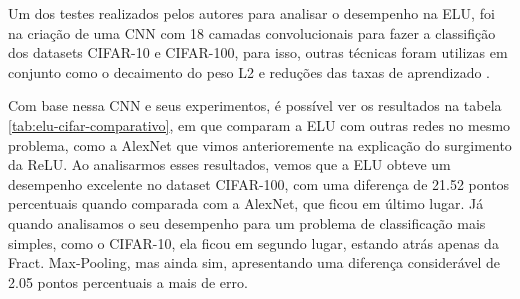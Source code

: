 Um dos testes realizados pelos autores para analisar o desempenho na ELU, foi na criação de uma CNN com 18 camadas convolucionais para fazer a classifição dos datasets CIFAR-10 e CIFAR-100, para isso, outras técnicas foram utilizas em conjunto como o decaimento do peso L2 e reduções das taxas de aprendizado \parencite{ELUArticle}.

Com base nessa CNN e seus experimentos, é possível ver os resultados na tabela \ref{tab:elu-cifar-comparativo}, em que \textcite{ELUArticle} comparam a ELU com outras redes no mesmo problema, como a AlexNet que vimos anterioremente na explicação do surgimento da ReLU. Ao analisarmos esses resultados, vemos que a ELU obteve um desempenho excelente no dataset CIFAR-100, com uma diferença de 21.52 pontos percentuais quando comparada com a AlexNet, que ficou em último lugar. Já quando analisamos o seu desempenho para um problema de classificação mais simples, como o CIFAR-10, ela ficou em segundo lugar, estando atrás apenas da Fract. Max-Pooling, mas ainda sim, apresentando uma diferença considerável de 2.05 pontos percentuais a mais de erro. 

